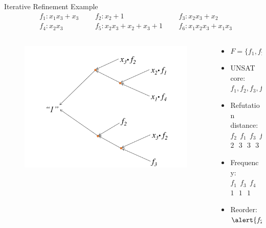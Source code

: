 \documentclass[xcolor=dvipsnames]{beamer}
\newcommand{\bi}{\begin{itemize}}
\newcommand{\ei}{\end{itemize}}
\begin{document}
\begin{frame}{\large{Iterative Refinement Example}}
\vspace{-0.1in}
\begin{alignat*}{4}
& f_1: x_1x_3+x_3 && ~~~f_2: x_2 + 1 && ~~~f_3: x_2x_3+x_2 \\
& f_4: x_2x_3 && ~~~f_5: x_2x_3 + x_2 + x_3 + 1 && ~~~f_6 : x_1x_2x_3 +x_1x_3
\end{alignat*}
\vspace{-0.5in}
\begin{columns}[onlytextwidth]
\begin{column}{0.6\textwidth}
\begin{figure}
\centering
\includegraphics[scale=0.3]{iterative_1.pdf}
\end{figure}
\end{column}
\begin{column}{0.4\textwidth}
\bi
\item $F=\{f_1,f_2,\dots,f_6\}\in\mathbb{F}_2[x_1,x_2,x_3]$
\item UNSAT core: $f_1,f_2,f_3,f_4$
\item \alert{Refutation distance}: \\
		$f_2~~f_1~~f_3~~f_4$\\
		$2~~~3~~~3~~~3$
\item \alert{Frequency}:\\
		$f_1~~f_3~~f_4$\\
		$1~~~1~~~1$
\item Reorder: $\alert{f_2},f_1,f_3,f_4$
\ei
\end{column}
\end{columns}
\end{frame}
\end{document}
